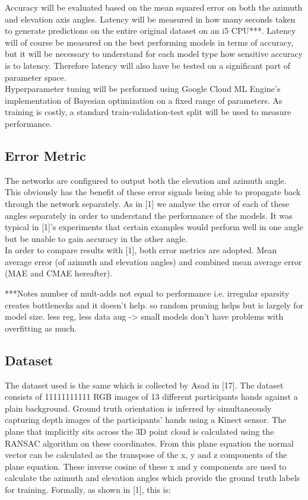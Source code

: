 \documentclass{article}
\begin{document}
Accuracy will be evaluated based on the mean squared error on both the azimuth and elevation axis angles. Latency will be measured in how many seconds taken to generate predictions on the entire original dataset on an i5 CPU***. Latency will of course be measured on the best performing models in terms of accuracy, but it will be necessary to understand for each model type how sensitive accuracy is to latency. Therefore latency will also have be tested on a significant part of parameter space.\\

Hyperparameter tuning will be performed using Google Cloud ML Engine's implementation of Bayesian optimization on a fixed range of parameters. As training is costly, a standard train-validation-test split will be used to measure performance.\\

\subsection{Error Metric}
The networks are configured to output both the elevation and azimuth angle. This obviously has the benefit of these error signals being able to propagate back through the network separately. As in [1] we analyse the error of each of these angles separately in order to understand the performance of the models. It was typical in [1]'s experiments that certain examples would perform well in one angle but be unable to gain accuracy in the other angle.\\

In order to compare results with [1], both error metrics are adopted. Mean average error (of azimuth and elevation angles) and combined mean average error (MAE and CMAE hereafter).


***Notes
number of mult-adds not equal to performance i.e. irregular sparsity creates bottlenecks and it doesn't help. so random pruning helps but is largely for model size. less reg, less data aug -> small models don't have problems with overfitting as much.
\subsection*{Dataset}
The dataset used is the same which is collected by Asad in [17]. The dataset consists of 11111111111 RGB images of 13 different participants hands against a plain background. Ground truth orientation is inferred by simultaneously capturing depth images of the participants' hands using a Kinect sensor. The plane that implicitly sits across the 3D point cloud is calculated using the RANSAC algorithm on these coordinates. From this plane equation the normal vector can be calculated as the transpose of the x, y and z components of the plane equation. These inverse cosine of these x and y components are used to calculate the azimuth and elevation angles which provide the ground truth labels for training. Formally, as shown in [1], this is:
\end{document}
